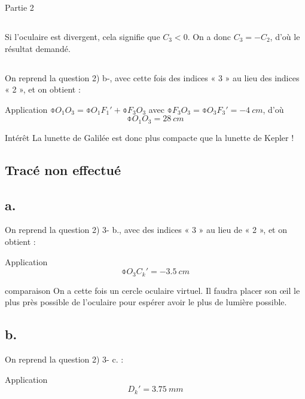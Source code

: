 \documentclass[10pt,a5paper,notitlepage]{book}
\begin{document}
\begin{center}
    \huge Partie 2
\end{center}

\subsection{}
Si l'oculaire est divergent, cela signifie que $C_3 < 0$. On a donc $C_3 = -
C_2$, d'où le résultat demandé.

\subsection{}
On reprend la question 2) b-, avec cette fois des indices « 3 » au lieu des
indices « 2 », et on obtient :

\begin{NCexem}{Application}
    $\obar{O_1O_3} = \obar{O_1F_1'} + \obar{F_3O_3}$ avec $\obar{F_3O_3} =
    \obar{O_3F_3'} = \SI{-4}{cm}$, d'où
    \[ \boxed{\obar{O_1O_3} = \SI{+28}{cm}} \]
\end{NCexem}

\begin{inte}{Intérêt}
    La lunette de Galilée est donc plus compacte que la lunette de Kepler !
\end{inte}

\subsection{Tracé non effectué}

\subsection{a.}
On reprend la question 2) 3- b., avec des indices « 3 » au lieu de « 2 », et on
obtient :
\begin{NCexem}{Application}
    \[ \boxed{\obar{O_3C_k'} = \SI{-3.5}{cm}}\]
\end{NCexem}

\begin{rema}{comparaison}
    On a cette fois un cercle oculaire virtuel. Il faudra placer son œil le plus
    près possible de l'oculaire pour espérer avoir le plus de lumière possible.
\end{rema}

\setcounter{subsection}{6}
\subsection{b.}
On reprend la question 2) 3- c. :
\begin{NCexem}{Application}
    \[ \boxed{D_k' = \SI{3.75}{mm}} \]
\end{NCexem}
\end{document}
